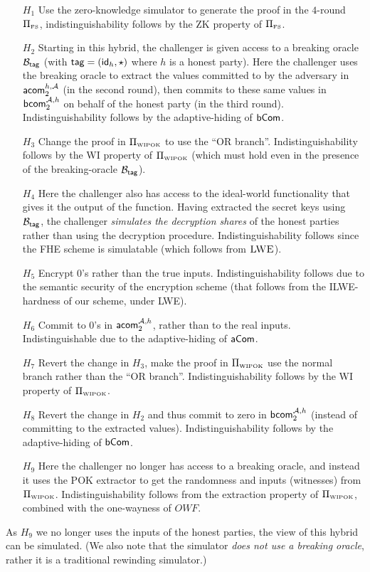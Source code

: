 \begin{itemize}
\item[$H_1$] Use the zero-knowledge simulator to generate the proof in the $4$-round $\Pi_{{\scriptscriptstyle\mathrm{FS}}}$, indistinguishability follows by the ZK property of $\Pi_{{\scriptscriptstyle\mathrm{FS}}}$.
\item[$H_2$] Starting in this hybrid, the challenger is given access to a breaking oracle $\mathcal{B}_{\mathsf{tag}}$ (with $\mathsf{tag}=(\mathsf{id}_h,\star)$ where $h$ is a honest party). Here the challenger uses the breaking oracle to extract the values committed to by the adversary in $\mathsf{acom}_2^{h,{\cal A}}$ (in the second round), then commits to these same values in ${\mathsf{bcom}}_2^{{\cal A},h}$ on behalf of the honest party (in the third round). Indistinguishability follows by the adaptive-hiding of $\mathsf{bCom}$.

\item[$H_3$] Change the proof in $\Pi_{{\scriptscriptstyle\mathrm{WIPOK}}}$ to use the ``OR branch''. Indistinguishability follows by the WI property of $\Pi_{{\scriptscriptstyle\mathrm{WIPOK}}}$ (which must hold even in the presence of the breaking-oracle $\mathcal{B}_{\mathsf{tag}}$). 

\item[$H_4$] Here the challenger also has access to the ideal-world functionality that gives it the output of the function. Having extracted the secret keys using $\mathcal{B}_{\mathsf{tag}}$, the challenger \emph{simulates the decryption shares} of the honest parties rather than using the decryption procedure.
  Indistinguishability follows since the FHE scheme is simulatable (which follows from $\textsc{LWE}$).

\item[$H_5$] Encrypt $0$'s rather than the true inputs. Indistinguishability follows due to the semantic security of the encryption scheme (that follows from the ILWE-hardness of our scheme, under LWE).

\item[$H_6$] Commit to $0$'s in $\mathsf{acom}_2^{{\cal A},h}$, rather than to the real inputs. Indistinguishable due to the adaptive-hiding of $\mathsf{aCom}$.

\item[$H_7$] Revert the change in $H_3$, make the proof in $\Pi_{{\scriptscriptstyle\mathrm{WIPOK}}}$ use the normal branch rather than the ``OR branch''. Indistinguishability follows by the WI property of $\Pi_{{\scriptscriptstyle\mathrm{WIPOK}}}$.

\item[$H_8$] Revert the change in $H_2$ and thus commit to zero in ${\mathsf{bcom}}_2^{{\cal A},h}$ (instead of committing to the extracted values).  Indistinguishability follows by the adaptive-hiding of $\mathsf{bCom}$.

\item[$H_9$] Here the challenger no longer has access to a breaking oracle, and instead it uses the POK extractor to get the randomness and inputs (witnesses) from $\Pi_{{\scriptscriptstyle\mathrm{WIPOK}}}$. Indistinguishability follows from the extraction property of $\Pi_{{\scriptscriptstyle\mathrm{WIPOK}}}$, combined with the one-wayness of $OWF$.
\end{itemize}
As $H_9$ we no longer uses the inputs of the honest parties, the view of this hybrid can be simulated. (We also note that the simulator \emph{does not use a breaking oracle}, rather it is a traditional rewinding simulator.)


